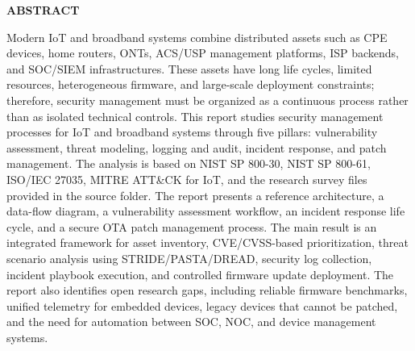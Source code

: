 \documentclass[../DoAn.tex]{subfiles}
\begin{document}
\begin{center}
    \Large{\textbf{ABSTRACT}}\\
\end{center}
\vspace{1cm}
Modern IoT and broadband systems combine distributed assets such as CPE devices, home routers, ONTs, ACS/USP management platforms, ISP backends, and SOC/SIEM infrastructures. These assets have long life cycles, limited resources, heterogeneous firmware, and large-scale deployment constraints; therefore, security management must be organized as a continuous process rather than as isolated technical controls. This report studies security management processes for IoT and broadband systems through five pillars: vulnerability assessment, threat modeling, logging and audit, incident response, and patch management. The analysis is based on NIST SP 800-30, NIST SP 800-61, ISO/IEC 27035, MITRE ATT\&CK for IoT, and the research survey files provided in the source folder. The report presents a reference architecture, a data-flow diagram, a vulnerability assessment workflow, an incident response life cycle, and a secure OTA patch management process. The main result is an integrated framework for asset inventory, CVE/CVSS-based prioritization, threat scenario analysis using STRIDE/PASTA/DREAD, security log collection, incident playbook execution, and controlled firmware update deployment. The report also identifies open research gaps, including reliable firmware benchmarks, unified telemetry for embedded devices, legacy devices that cannot be patched, and the need for automation between SOC, NOC, and device management systems.
\end{document}
